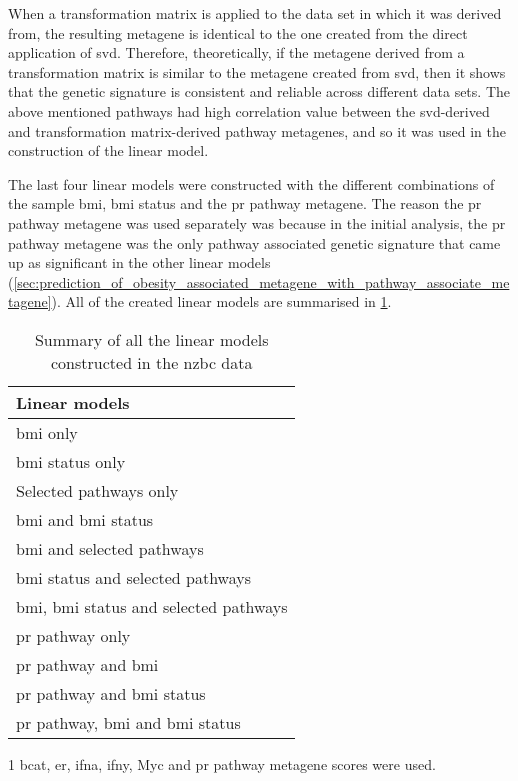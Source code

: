 When a transformation matrix is applied to the data set in which it was derived from, the resulting metagene is identical to the one created from the direct application of \gls{svd}.
Therefore, theoretically, if the metagene derived from a transformation matrix is similar to the metagene created from \gls{svd}, then it shows that the genetic signature is consistent and reliable across different data sets.
The above mentioned pathways had high correlation value between the \gls{svd}-derived and transformation matrix-derived pathway metagenes, and so it was used in the construction of the linear model.

The last four linear models were constructed with the different combinations of the sample \gls{bmi}, \gls{bmi} status and the \gls{pr} pathway metagene.
The reason the \gls{pr} pathway metagene was used separately was because in the initial analysis, the \gls{pr} pathway metagene was the only pathway associated genetic signature that came up as significant in the other linear models (\cref{sec:prediction_of_obesity_associated_metagene_with_pathway_associate_metagene}).
All of the created linear models are summarised in \cref{tab:lm_model_method}.

\begin{table}[htpb]
	\centering
	\begin{threeparttable}
		\caption{Summary of all the linear models constructed in the \gls{nzbc} data}
		\label{tab:lm_model_method}
		\begin{tabular}{l}
			Linear models\\
			\hline
			\hline
			\gls{bmi} only\\
			\gls{bmi} status only\\
			Selected pathways only\tnote{1}\\
			\gls{bmi} and \gls{bmi} status\\
			\gls{bmi} and selected pathways\tnote{1}\\
			\gls{bmi} status and selected pathways\tnote{1}\\
			\gls{bmi}, \gls{bmi} status and selected pathways\tnote{1}\\
			\gls{pr} pathway only\\
			\gls{pr} pathway and \gls{bmi}\\
			\gls{pr} pathway and \gls{bmi} status\\
			\gls{pr} pathway, \gls{bmi} and \gls{bmi} status\\
			\hline
			\hline
		\end{tabular}
		\begin{tablenotes}
			\begin{footnotesize}
			\item [1] \gls{bcat}, \gls{er}, \gls{ifna}, \Gls{ifny}, Myc and \gls{pr} pathway metagene scores were used.
			\end{footnotesize}
		\end{tablenotes}
	\end{threeparttable}
\end{table}

